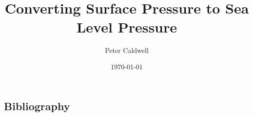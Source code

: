 \documentclass[12pt]{article}
\title{Converting Surface Pressure to Sea Level Pressure}
\author[1]{Peter Caldwell}
\date{\today}
\affil[1]{Lawrence Livermore National Lab, Livermore CA}
\begin{document}
\maketitle{}



\subsection{Bibliography}

\end{document}
